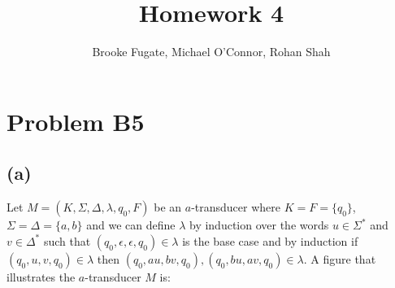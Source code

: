\documentclass[12pt]{article}
\begin{document}
\pagestyle{plain}
\titleformat{\subsection}[runin]
  {\normalfont\large\bfseries}{\thesubsection}{1em}{}

\title{Homework 4}
\author{Brooke Fugate, Michael O'Connor, Rohan Shah}
\date{}

\maketitle

\section*{Problem B5}
\subsection*{(a)}
Let $M = (K, \Sigma, \Delta, \lambda, q_0, F)$ be an $a$-transducer where
$K = F = \{q_0\}$, $\Sigma = \Delta = \{a,b\}$ and we can define $\lambda$
by induction over the words $u\in \Sigma^*$ and $v \in \Delta^*$ such that
$(q_0, \epsilon, \epsilon, q_0) \in \lambda$ is the base case and by induction
if $(q_0, u, v, q_0) \in \lambda$ then $(q_0,au,bv,q_0), (q_0,bu,av,q_0) \in
\lambda$. A figure that illustrates the $a$-transducer $M$ is:
\begin{center}
\end{center}
\end{document}
